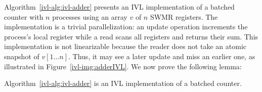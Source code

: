 Algorithm~\ref{ivl-alg:ivl-adder} presents an IVL implementation of a batched counter
with $n$ processes using an array $v$ of $n$ SWMR registers.
The implementation is a trivial parallelization: an {\sc update} operation increments
the process's local
register while a {\sc read} scans all registers and returns their sum. This
implementation is not linearizable because the reader does not take an atomic snapshot
of $v[1 \dots n]$. Thus, it may see a later {\sc update}
and miss an earlier one, as illustrated in Figure~\ref{ivl-img:adderIVL}.
We now prove the following lemma:
\begin{lemma}
    Algorithm~\ref{ivl-alg:ivl-adder} is an IVL implementation of a batched counter.
    \label{ivl-lmma:ivl-adder}
\end{lemma}
